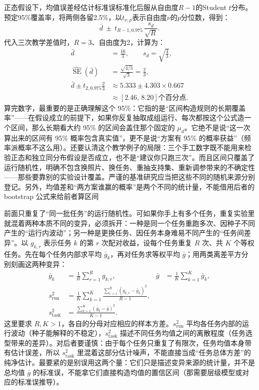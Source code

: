 正态假设下，均值误差经估计标准误标准化后服从自由度$R-1$的Student $t$分布。预定95\%覆盖率，将两侧各留2.5\%，以$t_{\nu,p}$表示自由度$\nu$的$p$分位数，得到：
\begin{equation}
  \bar d\ \pm\ t_{R-1,0.975}\,
    \frac{s_d}{\sqrt R}.
  \label{eq:ket-evaluation-paired-interval}
\end{equation}
代入三次教学差值时，$R=3$、自由度为2，计算为：
\[
  \begin{aligned}
    \bar d&=\frac{16}{3},\qquad s_d=\sqrt{\frac43},\\
    \widehat{\operatorname{SE}}(\bar d)&=\frac{\sqrt{4/3}}{\sqrt3}
      =\frac23,\\
    \bar d\pm t_{2,0.975}\frac23
      &\approx5.333\pm4.303\times0.667\\
      &\approx[2.46,\,8.20]\text{个百分点}.
  \end{aligned}
\]
算完数字，最重要的是正确理解这个 95\%：它指的是“区间构造规则的长期覆盖率”——在假设成立的前提下，如果你反复抽取成组运行、每次都按这个公式造一个区间，那么长期看大约 95\% 的区间会盖住那个固定的 $\mu_d$。它绝不是说“这一次算出来的区间有 95\% 概率包含真实值”，更不是说“方案有 95\% 的概率获益”（频率派概率不这么用）。还要认清这个教学例子的局限：三个手工数字既不能用来检验正态和独立同分布假设是否成立，也不是“建议你只跑三次”。而且区间只覆盖了运行随机性，明确不包含换照片、换任务、重抽支持集、重新调参带来的不确定性——那些要靠别的实验设计覆盖。严谨的基准研究应当把这些不同的随机来源分别登记。另外，均值差和“两方案谁赢的概率”是两个不同的统计量，不能借用后者的 bootstrap 公式来给前者算区间

前面只重复了“同一批任务”的运行随机性。可如果你手上有多个任务，重复实验里就混着两种本质不同的变异，必须拆开：一种是同一个任务重跑多次、因种子不同产生的“运行内波动”；另一种是更换任务、因任务本身难易不同产生的“任务间差异”。以 $g_{k,r}$ 表示任务 $k$ 的第 $r$ 次配对收益，设每个任务重复 $R$ 次、共 $K$ 个等权任务。先在每个任务内部求平均 $\bar g_k$，再对任务求等权平均 $\bar g$；用两类离差平方分别刻画这两种变异：
\begin{equation}
  \begin{aligned}
    \bar g_k&=\frac1R\sum_{r=1}^{R}g_{k,r},&
    \bar g&=\frac1K\sum_{k=1}^{K}\bar g_k,\\
    s_{\mathrm{run}}^2
      &=\frac1K\sum_{k=1}^{K}
        \frac{\sum_{r=1}^{R}(g_{k,r}-\bar g_k)^2}{R-1},\\
    s_{\mathrm{task}}^2
      &=\frac{\sum_{k=1}^{K}(\bar g_k-\bar g)^2}{K-1}.
  \end{aligned}
  \label{eq:ket-evaluation-two-variations}
\end{equation}
这里要求 $R,K>1$，各自的分母对应相应的样本方差。$s_{\mathrm{run}}^2$ 平均各任务内部的运行波动（种子能解释的不稳定），$s_{\mathrm{task}}^2$ 描述不同任务均值之间的离散程度（任务选型带来的差异）。对后者要谨慎：由于每个任务只重复了有限次，任务均值本身带有估计误差，所以 $s_{\mathrm{task}}^2$ 里混着这部分估计噪声，不能直接当成“任务总体方差”的纯净估计。最要紧的是别误用这两个量：它们只是描述变异来源的统计量，并不是总均值 $\bar g$ 的标准误，不能拿它们直接构造均值的置信区间（那需要层级模型或对应的标准误推导）。

